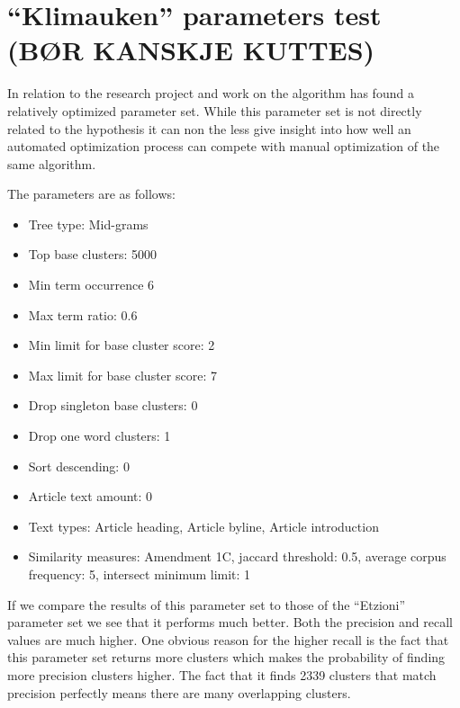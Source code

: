 \section{``Klimauken'' parameters test (BØR KANSKJE KUTTES)}
In relation to the  research project and work on the \CTC algorithm \citeauthor{Moe2013} has found a relatively optimized parameter set. While this parameter set is not directly related to the hypothesis it can non the less give insight into how well an automated optimization process can compete with manual optimization of the same algorithm.

The parameters are as follows:
\begin{itemize}
  \item Tree type: Mid-grams
  \item Top base clusters: 5000
  \item Min term occurrence 6
  \item Max term ratio: 0.6
  \item Min limit for base cluster score: 2
  \item Max limit for base cluster score: 7
  \item Drop singleton base clusters: 0
  \item Drop one word clusters: 1
  \item Sort descending: 0
  \item Article text amount: 0
  \item Text types: Article heading, Article byline, Article introduction
  \item Similarity measures: Amendment 1C, jaccard threshold: 0.5, average corpus frequency: 5, intersect minimum limit: 1
\end{itemize}

If we compare the results of this parameter set to those of the ``Etzioni'' parameter set we see that it performs much better. Both the precision and recall values are much higher. One obvious reason for the higher recall is the fact that this parameter set returns more clusters which makes the probability of finding more precision clusters higher. The fact that it finds 2339 clusters that match precision perfectly means there are many overlapping clusters.

